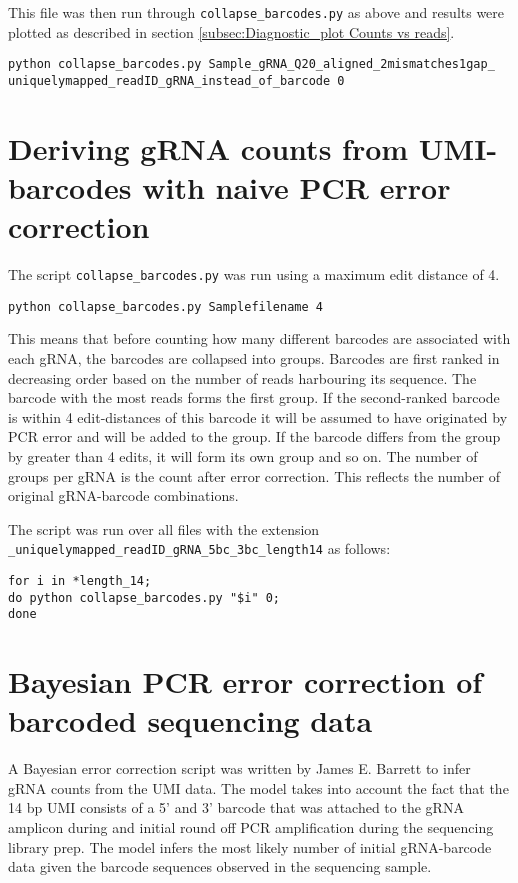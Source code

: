 This file was then run through \verb|collapse_barcodes.py| as above and results were plotted as described in section \ref{subsec:Diagnostic_plot Counts vs reads}.

\begin{lstlisting}
python collapse_barcodes.py Sample_gRNA_Q20_aligned_2mismatches1gap_
uniquelymapped_readID_gRNA_instead_of_barcode 0
\end{lstlisting}

\section{Deriving gRNA counts from UMI-barcodes with naive PCR error correction}

The script \verb|collapse_barcodes.py| was run using a maximum edit distance of 4. 

\begin{lstlisting}
python collapse_barcodes.py Samplefilename 4
\end{lstlisting}

This means that before counting how many different barcodes are associated with each gRNA, the barcodes are collapsed into groups. Barcodes are first ranked in decreasing order based on the number of reads harbouring its sequence. The barcode with the most reads forms the first group. If the second-ranked barcode is within 4 edit-distances of this barcode it will be assumed to have originated by PCR error and will be added to the group. If the barcode differs from the group by greater than 4 edits, it will form its own group and so on. The number of groups per gRNA is the count after error correction. This reflects the number of original gRNA-barcode combinations.


The script was run over all files with the extension \verb|_uniquelymapped_readID_gRNA_5bc_3bc_length14| as follows:

\begin{lstlisting}
for i in *length_14;
do python collapse_barcodes.py "$i" 0;
done
\end{lstlisting}


\section{Bayesian PCR error correction of barcoded sequencing data }

A Bayesian error correction script was written by James E. Barrett to infer gRNA counts from the UMI data. The model takes into account the fact that the 14 bp UMI consists of a 5' and 3' barcode that was attached to the gRNA amplicon during and initial round off PCR amplification during the sequencing library prep. The model infers the most likely number of initial gRNA-barcode data given the barcode sequences observed in the sequencing sample.

